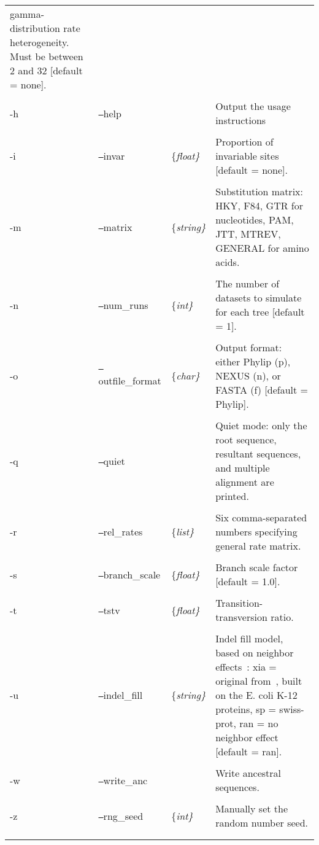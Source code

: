 \documentclass[10pt]{article}
\begin{document}
\begin{longtable}{p{0.40in}llp{3in}}
												gamma-distribution rate
												heterogeneity. Must be between 2 and 32
												[default = none]. \\
\\
-h & {\tt --}help & & Output the usage instructions\\
\\
-i & {\tt --}invar & \{\it float\} & Proportion of invariable sites [default = none].\\
\\
-m & {\tt --}matrix & \{\it string\} & Substitution matrix: HKY, F84, GTR for nucleotides, PAM, 
										JTT, MTREV, GENERAL for amino acids. \\
\\
-n & {\tt --}num\_runs & \{\it int\} & The number of datasets to simulate for each tree 
										[default = 1].\\
\\
-o & {\tt --}outfile\_format & \{\it char\} & Output format: either Phylip (p), NEXUS (n), or 
												FASTA (f) [default = Phylip]. \\
\\
-q & {\tt --}quiet & & Quiet mode: only the root sequence, resultant sequences, and multiple 
							alignment are printed.\\
\\
-r & {\tt --}rel\_rates & \{\it list\} & Six comma-separated numbers specifying general rate matrix.\\
\\
-s & {\tt --}branch\_scale & \{\it float\} & Branch scale factor [default = 1.0].\\
\\
-t & {\tt --}tstv & \{\it float\} & Transition-transversion ratio. \\
\\
-u & {\tt --}indel\_fill & \{\it string\} & Indel fill model, based on neighbor 
											effects~\cite{Xia02}: xia = original 
											from~\cite{Xia02}, built on the E. coli K-12 
											proteins, sp = swiss-prot, ran = no neighbor effect 
											[default = ran]. \\
\\
-w & {\tt --}write\_anc & & Write ancestral sequences. \\
\\
-z & {\tt --}rng\_seed & \{\it int\} & Manually set the random number seed.\\
\\
\hline
\label{tab:global}
\end{longtable}
\end{document}
